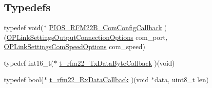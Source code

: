 \subsection*{\-Typedefs}
\begin{DoxyCompactItemize}
\item 
typedef void($\ast$ \hyperlink{group___p_i_o_s___r_f_m22_b_gaa8a316480e010f5e383d29257c0686cd}{\-P\-I\-O\-S\-\_\-\-R\-F\-M22\-B\-\_\-\-Com\-Config\-Callback} )(\hyperlink{group___o_p_link_settings_ga1511abaff051d1cd559ddd52fea0bfa8}{\-O\-P\-Link\-Settings\-Output\-Connection\-Options} com\-\_\-port, \hyperlink{group___o_p_link_settings_gaf4886a2c0a8f8a79c93d27c94ee503ba}{\-O\-P\-Link\-Settings\-Com\-Speed\-Options} com\-\_\-speed)
\item 
typedef int16\-\_\-t($\ast$ \hyperlink{group___p_i_o_s___r_f_m22_b_ga10adbdf30d2b2a9c6eab132094364df2}{t\-\_\-rfm22\-\_\-\-Tx\-Data\-Byte\-Callback} )(void)
\item 
typedef bool($\ast$ \hyperlink{group___p_i_o_s___r_f_m22_b_ga6d517bc1c96f4b523eb7a289850c3bb8}{t\-\_\-rfm22\-\_\-\-Rx\-Data\-Callback} )(void $\ast$data, uint8\-\_\-t len)
\end{DoxyCompactItemize}
